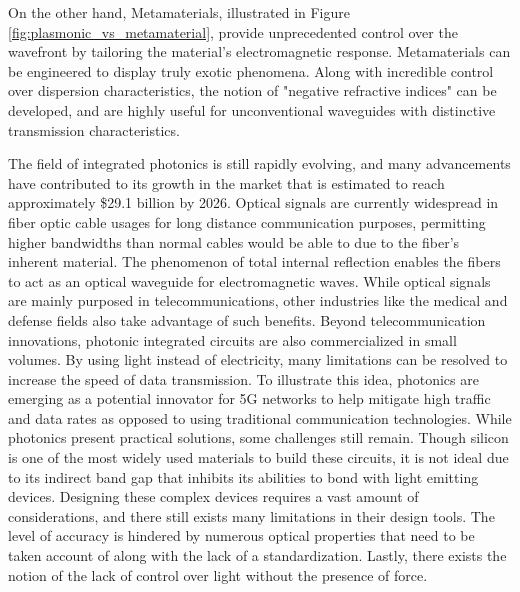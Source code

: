 \documentclass[10pt]{article}
\begin{document}
On the other hand, Metamaterials, illustrated in Figure \ref{fig:plasmonic_vs_metamaterial}, provide unprecedented control over the wavefront by tailoring the material's electromagnetic response. 
Metamaterials can be engineered to display truly exotic phenomena. Along with incredible control over dispersion characteristics, the notion of "negative refractive indices" can be developed, and are highly 
useful for unconventional waveguides with distinctive transmission characteristics.

The field of integrated photonics is still rapidly evolving, and many advancements have contributed to its growth in the market that is estimated to reach approximately \$29.1 billion by 2026. Optical signals are currently widespread in fiber optic cable usages for long distance communication purposes, permitting higher bandwidths than normal cables would be able to due to the fiber’s inherent material. The phenomenon of total internal reflection enables the fibers to act as an optical waveguide for electromagnetic waves. While optical signals are mainly purposed in telecommunications, other industries like the medical and defense fields also take advantage of such benefits. Beyond telecommunication innovations, photonic integrated circuits are also commercialized in small volumes. By using light instead of electricity, many limitations can be resolved to increase the speed of data transmission. To illustrate this idea, photonics are emerging as a potential innovator for 5G networks to help mitigate high traffic and data rates as opposed to using traditional communication technologies. While photonics present practical solutions, some challenges still remain. Though silicon is one of the most widely used materials to build these circuits, it is not ideal due to its indirect band gap that inhibits its abilities to bond with light emitting devices. Designing these complex devices requires a vast amount of considerations, and there still exists many limitations in their design tools. The level of accuracy is hindered by numerous optical properties that need to be taken account of along with the lack of a standardization. Lastly, there exists the notion of the lack of control over light without the presence of force.


\end{document}
